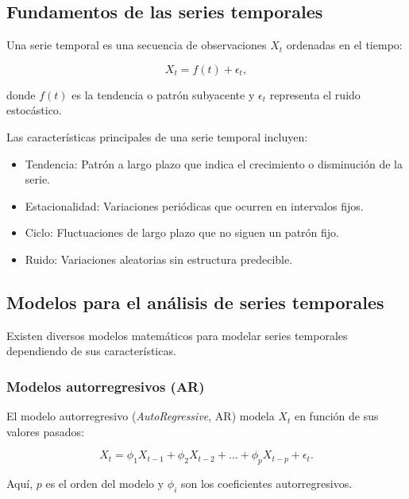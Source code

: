 \begin{itemize}
		\subsection{Fundamentos de las series temporales}
		
		Una serie temporal es una secuencia de observaciones \( X_t \) ordenadas en el tiempo:
		
		\begin{equation}
			X_t = f(t) + \epsilon_t,
		\end{equation}
		
		donde \( f(t) \) es la tendencia o patrón subyacente y \( \epsilon_t \) representa el ruido estocástico.
		
		Las características principales de una serie temporal incluyen:
		
		\begin{itemize}
			\item Tendencia: Patrón a largo plazo que indica el crecimiento o disminución de la serie.
			\item Estacionalidad: Variaciones periódicas que ocurren en intervalos fijos.
			\item Ciclo: Fluctuaciones de largo plazo que no siguen un patrón fijo.
			\item Ruido: Variaciones aleatorias sin estructura predecible.
		\end{itemize}
		
		\subsection{Modelos para el análisis de series temporales}
		
		Existen diversos modelos matemáticos para modelar series temporales dependiendo de sus características.
		
		\subsubsection{Modelos autorregresivos (AR)}
		
		El modelo autorregresivo (\textit{AutoRegressive}, AR) modela \( X_t \) en función de sus valores pasados:
		
		\begin{equation}
			X_t = \phi_1 X_{t-1} + \phi_2 X_{t-2} + \dots + \phi_p X_{t-p} + \epsilon_t.
		\end{equation}
		
		Aquí, \( p \) es el orden del modelo y \( \phi_i \) son los coeficientes autorregresivos.
		

\end{itemize}
